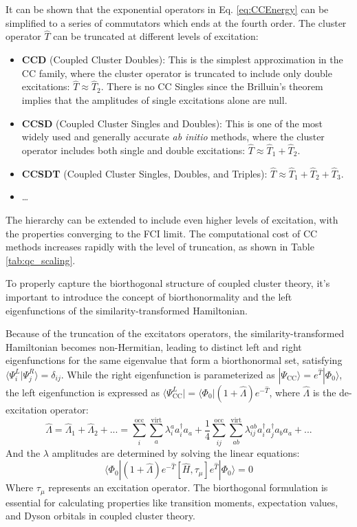It can be shown that the exponential operators in Eq. \ref{eq:CCEnergy} can be simplified to a series of commutators which ends at the fourth order. The cluster operator $\hat{T}$ can be truncated at different levels of excitation:
\begin{itemize}
    \item \textbf{CCD} (Coupled Cluster Doubles): This is the simplest approximation in the CC family, where the cluster operator is truncated to include only double excitations: $\hat{T} \approx \hat{T}_2$. There is no CC Singles since the Brilluin's theorem implies that the amplitudes of single excitations alone are null. 
    \item \textbf{CCSD} (Coupled Cluster Singles and Doubles): This is one of the most widely used and generally accurate \textit{ab initio} methods, where the cluster operator includes both single and double excitations: $\hat{T} \approx \hat{T}_1 + \hat{T}_2$.
    \item \textbf{CCSDT} (Coupled Cluster Singles, Doubles, and Triples): $\hat{T} \approx \hat{T}_1 + \hat{T}_2 + \hat{T}_3$.
    \item \ldots
\end{itemize}
The hierarchy can be extended to include even higher levels of excitation,  with the properties converging to the FCI limit. The computational cost of CC methods increases rapidly with the level of truncation, as shown in Table \ref{tab:qc_scaling}.

To properly capture the biorthogonal structure of coupled cluster theory, it's important to introduce the concept of biorthonormality and the left eigenfunctions of the similarity-transformed Hamiltonian.

Because of the truncation of the excitators operators, the similarity-transformed Hamiltonian becomes non-Hermitian, leading to distinct left and right eigenfunctions for the same eigenvalue that form a biorthonormal set, satisfying $\langle \Psi_i^L | \Psi_j^R \rangle = \delta_{ij}$. While the right eigenfunction is parameterized as $|\Psi_{\text{CC}}\rangle = e^{\hat{T}}|\Phi_0\rangle$, the left eigenfunction is expressed as $\langle\Psi_{\text{CC}}^L| = \langle\Phi_0|(1 + \hat{\Lambda})e^{-\hat{T}}$, where $\hat{\Lambda}$ is the de-excitation operator:
\begin{equation}\label{eq:Lambda}
    \hat{\Lambda} = \hat{\Lambda}_1 + \hat{\Lambda}_2 + ... = \sum_i^{\text{occ}}\sum_a^{\text{virt}} \lambda_i^a a_i^{\dagger}a_a + \frac{1}{4}\sum_{ij}^{\text{occ}}\sum_{ab}^{\text{virt}} \lambda_{ij}^{ab}a_i^{\dagger}a_j^{\dagger}a_b a_a + ...
\end{equation}
And the $\lambda$ amplitudes are determined by solving the linear equations:
\begin{equation}
        \langle\Phi_0|(1 + \hat{\Lambda})e^{-\hat{T}}[\hat{H},\tau_{\mu}]e^{\hat{T}}|\Phi_0\rangle = 0
\end{equation}
Where $\tau_{\mu}$ represents an excitation operator. The biorthogonal formulation is essential for calculating properties like transition moments, expectation values, and Dyson orbitals in coupled cluster theory.

